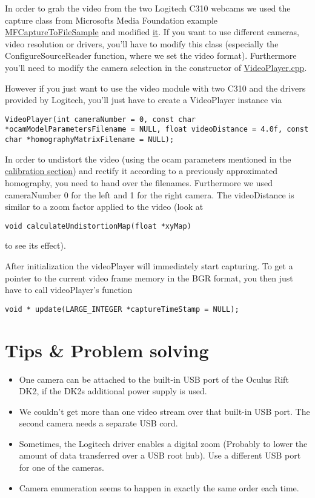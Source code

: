 In order to grab the video from the two Logitech C310 webcams we used the capture
class from Microsofts Media Foundation example
\href{https://msdn.microsoft.com/en-us/library/windows/desktop/ee663604\%28v=vs.85\%29.aspx}{MFCaptureToFileSample}
and modified
\href{https://github.com/ands/OculusMeetsAR/blob/master/ARLib/src/Video/CCapture.cpp}{it}.
If you want to use different cameras, video resolution or drivers,
you'll have to modify this class (especially the ConfigureSourceReader
function, where we set the video format). Furthermore you'll need to
modify the camera selection in the constructor of
\href{https://github.com/ands/OculusMeetsAR/blob/master/ARLib/src/Video/videoplayer.cpp}{VideoPlayer.cpp}.

However if you just want to use the video module with two C310 and the
drivers provided by Logitech, you'll just have to create a VideoPlayer
instance via
\begin{lstlisting}
VideoPlayer(int cameraNumber = 0, const char *ocamModelParametersFilename = NULL, float videoDistance = 4.0f, const char *homographyMatrixFilename = NULL);
\end{lstlisting}
In order to undistort the video (using the ocam parameters mentioned in
the \hyperref[sec:stereo_calibration]{calibration section}) and rectify it according to a previously approximated homography, you need to hand over the filenames. Furthermore we used cameraNumber 0 for the left and 1 for the right camera. The videoDistance is similar to a zoom factor applied to the video (look at
\begin{lstlisting}
void calculateUndistortionMap(float *xyMap)
\end{lstlisting}
to see its effect).

After initialization the videoPlayer will immediately start capturing. To get a pointer to the current video frame memory in the BGR format, you then just have to call videoPlayer's function
\begin{lstlisting}
void * update(LARGE_INTEGER *captureTimeStamp = NULL);
\end{lstlisting}

\section{Tips \& Problem solving}\label{tips-problem-solving}

\begin{itemize}
\itemsep1pt\parskip0pt
\item
  One camera can be attached to the built-in USB port of the Oculus Rift DK2, if the DK2s additional power supply is used.
\item
  We couldn't get more than one video stream over that built-in USB port. The second camera needs a separate USB cord.
\item
  Sometimes, the Logitech driver enables a digital zoom (Probably to lower the amount of data transferred over a USB root hub). Use a different USB port for one of the cameras.
\item
  Camera enumeration seems to happen in exactly the same order each time.
\end{itemize}